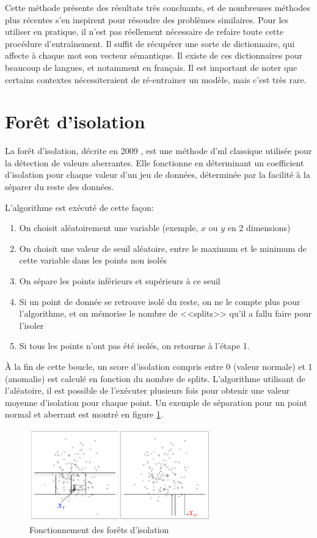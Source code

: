 \documentclass[openany, 11pt]{memoir}
\begin{document}
Cette méthode présente des résultats très concluants, et de nombreuses méthodes plus récentes s'en inspirent pour résoudre des problèmes similaires. Pour les utiliser en pratique, il n'est pas réellement nécessaire de refaire toute cette procédure d'entraînement. Il suffit de récupérer une sorte de dictionnaire, qui affecte à chaque mot son vecteur sémantique. Il existe de ces dictionnaires pour beaucoup de langues, et notamment en français. Il est important de noter que certains contextes nécessiteraient de ré-entrainer un modèle, mais c'est très rare.

\section{Forêt d'isolation}

La forêt d'isolation, décrite en 2009 \cite{isolationforest}, est une méthode d'\gls{ml} classique utilisée pour la détection de valeurs aberrantes. Elle fonctionne en déterminant un coefficient d'isolation pour chaque valeur d'un jeu de données, déterminée par la facilité à la séparer du reste des données.

L'algorithme est exécuté de cette façon:

\begin{enumerate}
	\item On choisit aléatoirement une variable (exemple, $x$ ou $y$ en 2 dimensions)
	\item On choisit une valeur de seuil aléatoire, entre le maximum et le minimum de cette variable dans les points non isolés
	\item On sépare les points inférieurs et supérieurs à ce seuil
	\item Si un point de donnée se retrouve isolé du reste, on ne le compte plus pour l'algorithme, et on mémorise le nombre de <<splits>> qu'il a fallu faire pour l'isoler
	\item Si tous les points n'ont pas été isolés, on retourne à l'étape 1.
\end{enumerate}

À la fin de cette boucle, un score d'isolation compris entre 0 (valeur normale) et 1 (anomalie) est calculé en fonction du nombre de splits. L'algorithme utilisant de l'aléatoire, il est possible de l'exécuter plusieurs fois pour obtenir une valeur moyenne d'isolation pour chaque point. Un exemple de séparation pour un point normal et aberrant est montré en figure \ref{isoforest}.

\begin{figure}[ht]
	\centering
	\includegraphics[width=0.7\textwidth]{images/isoforest.png}
	\caption{Fonctionnement des forêts d'isolation}
	\label{isoforest}
\end{figure}
\end{document}
